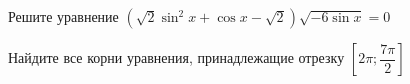 \begin{ex}
	\begin{condition}
		\begin{enumcols}[label=\asbuk*)]
			\item Решите уравнение \( (\sqrt{2}\sin^2 x +\cos x -\sqrt{2})\sqrt{-6\sin x} = 0 \)
			\item Найдите все корни уравнения, принадлежащие отрезку \( \left[2\pi;\dfrac{7\pi}{2}\right] \)
		\end{enumcols}
	\end{condition}
\end{ex}